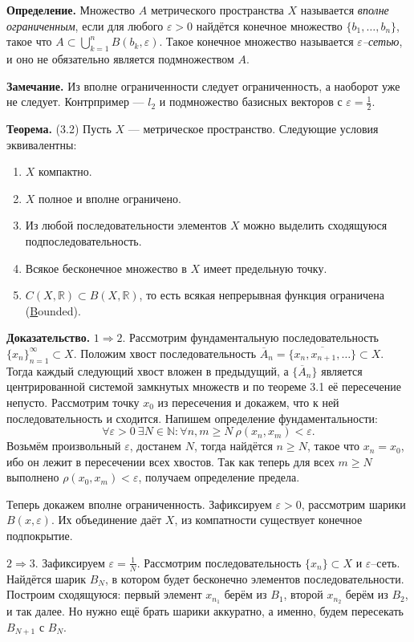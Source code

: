 \textbf{Определение.} Множество $A$ метрического пространства $X$ называется \textit{вполне ограниченным}, если для любого $\varepsilon > 0$ найдётся конечное множество $\{b_1, \dots, b_n\}$, такое что $A \subset \bigcup_{k=1}^n B(b_k, \varepsilon)$.
Такое конечное множество называется \textit{$\varepsilon$--сетью}, и оно не обязательно является подмножеством $A$.

\textbf{Замечание.} Из вполне ограниченности следует ограниченность, а наоборот уже не следует.
Контрпример --- $l_2$ и подмножество базисных векторов с $\varepsilon = \frac{1}{2}$.

\textbf{Теорема.} (3.2) Пусть $X$ --- метрическое пространство. Следующие условия эквивалентны:
\begin{enumerate}
    \item $X$ компактно.
    \item $X$ полное и вполне ограничено.
    \item Из любой последовательности элементов $X$ можно выделить сходящуюся подпоследовательность.
    \item Всякое бесконечное множество в $X$ имеет предельную точку.
    \item $C(X, \mathbb R) \subset B(X, \mathbb R)$, то есть всякая непрерывная функция ограничена (\underline{B}ounded).
\end{enumerate}

\textbf{Доказательство.} $1 \Rightarrow 2$. 
Рассмотрим фундаментальную последовательность $\{x_n\}_{n=1}^\infty \subset X$.
Положим хвост последовательность $\overline A_n = \overline {\{x_n, x_{n+1}, \dots \} } \subset X$.
Тогда каждый следующий хвост вложен в предыдущий, а $\{\overline A_n\}$ является центрированной системой замкнутых множеств и по теореме 3.1 её пересечение непусто.
Рассмотрим точку $x_0$ из пересечения и докажем, что к ней последовательность и сходится.
Напишем определение фундаментальности:
\[
    \forall \varepsilon > 0~\exists N \in \mathbb N: \forall n, m \ge N~\rho(x_n, x_m) < \varepsilon.
\]
Возьмём произвольный $\varepsilon$, достанем $N$, тогда найдётся $n \ge N$, такое что $x_n = x_0$, ибо он лежит в пересечении всех хвостов.
Так как теперь для всех $m \ge N$ выполнено $\rho(x_0, x_m) < \varepsilon$, получаем определение предела.

Теперь докажем вполне ограниченность.
Зафиксируем $\varepsilon > 0$, рассмотрим шарики $B(x, \varepsilon)$.
Их объединение даёт $X$, из компатности существует конечное подпокрытие.

$2 \Rightarrow 3$. Зафиксируем $\varepsilon = \frac{1}{N}$.
Рассмотрим последовательность $\{x_n\} \subset X$ и $\varepsilon$--сеть.
Найдётся шарик $B_N$, в котором будет бесконечно элементов последовательности.
Построим сходящуюся: первый элемент $x_{n_1}$ берём из $B_1$, второй $x_{n_2}$ берём из $B_2$, и так далее.
Но нужно ещё брать шарики аккуратно, а именно, будем пересекать $B_{N+1}$ с $B_N$.

